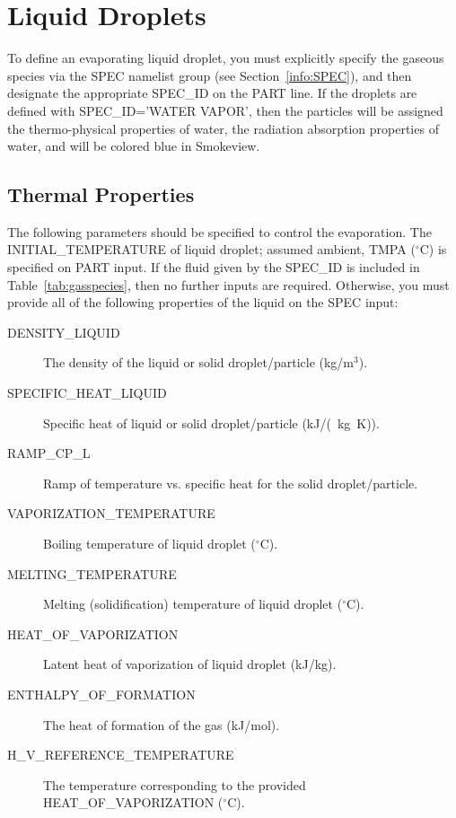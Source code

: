 \documentclass[11pt]{book}
\begin{document}
\section{Liquid Droplets}

To define an evaporating liquid droplet, you must explicitly specify the gaseous species via the {\ct SPEC} namelist group (see Section~\ref{info:SPEC}), and then
designate the appropriate {\ct SPEC\_ID} on the {\ct PART} line.
If the droplets are defined with {\ct SPEC\_ID='WATER VAPOR'}, then the particles will be assigned the thermo-physical properties of water,
the radiation absorption properties of water, and will be colored blue in Smokeview.


\subsection{Thermal Properties}
\label{thermal_part_props}

The following parameters should be specified to control the evaporation.  The {\ct INITIAL\_TEMPERATURE} of liquid droplet; assumed ambient, {\ct TMPA} ($^\circ$C) is specified on {\ct PART} input.  If the fluid given by the {\ct SPEC\_ID} is included in Table~\ref{tab:gasspecies},
then no further inputs are required. Otherwise, you must provide all of the following properties of the liquid on the {\ct SPEC} input:
\begin{description}
\item[{\ct DENSITY\_LIQUID}] The density of the liquid or solid droplet/particle (kg/m$^3$).
\item[{\ct SPECIFIC\_HEAT\_LIQUID}] Specific heat of liquid or solid droplet/particle (\si{kJ/(kg.K})).
\item[{\ct RAMP\_CP\_L}] Ramp of temperature vs. specific heat for the solid droplet/particle.
\item[{\ct VAPORIZATION\_TEMPERATURE}] Boiling temperature of liquid droplet ($^\circ$C).
\item[{\ct MELTING\_TEMPERATURE}] Melting (solidification) temperature of liquid droplet ($^\circ$C).
\item[{\ct HEAT\_OF\_VAPORIZATION}] Latent heat of vaporization of liquid droplet (kJ/kg).
\item[{\ct ENTHALPY\_OF\_FORMATION}] The heat of formation of the gas (kJ/mol).
\item[{\ct H\_V\_REFERENCE\_TEMPERATURE}] The temperature corresponding to the provided {\ct HEAT\_OF\_VAPORIZATION} ($^\circ$C).
\end{description}
\end{document}

